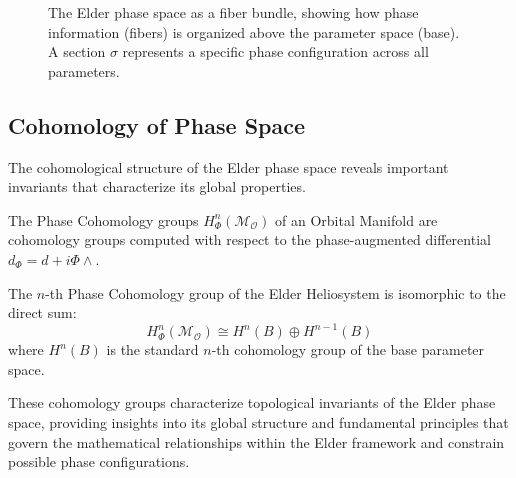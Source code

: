 \begin{theorem}
\begin{definition}
\begin{definition}
\begin{enumerate}
\begin{figure}[h]
\caption{The Elder phase space as a fiber bundle, showing how phase information (fibers) is organized above the parameter space (base). A section $\sigma$ represents a specific phase configuration across all parameters.}
\label{fig:phase_fiber_bundle}
\end{figure}

\subsection{Cohomology of Phase Space}

The cohomological structure of the Elder phase space reveals important invariants that characterize its global properties.

\begin{definition}
The Phase Cohomology groups $H^n_{\Phi}(\mathcal{M}_{\mathcal{O}})$ of an Orbital Manifold are cohomology groups computed with respect to the phase-augmented differential $d_{\Phi} = d + i\Phi \wedge$.
\end{definition}

\begin{theorem}
The $n$-th Phase Cohomology group of the Elder Heliosystem is isomorphic to the direct sum:
\begin{equation}
H^n_{\Phi}(\mathcal{M}_{\mathcal{O}}) \cong H^n(B) \oplus H^{n-1}(B)
\end{equation}
where $H^n(B)$ is the standard $n$-th cohomology group of the base parameter space.
\end{theorem}

These cohomology groups characterize topological invariants of the Elder phase space, providing insights into its global structure and fundamental principles that govern the mathematical relationships within the Elder framework and constrain possible phase configurations.


\end{enumerate}
\end{definition}
\end{definition}
\end{theorem}
